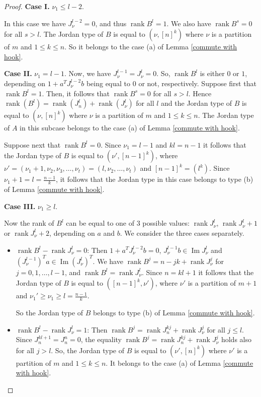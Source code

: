 \documentclass[10pt,a4paper]{amsart}
\DeclareMathOperator{\im}{Im}
\DeclareMathOperator{\rank}{rank}
\begin{document}
\begin{proof}
{\bf Case I.} $\nu_1\leq l-2$.

In this case we have $J_{\nu}^{l-2}=0$, and thus $\rank B^{l}=1$. We also have $\rank B^{s}=0$ for all $s>l$. The Jordan type of $B$ is equal to 
$\left(\nu, [n]^k\right)$ where $\nu$ is a partition of $m$ and $1\leq k\leq n$. So it belongs to the case (a) of Lemma \ref{commute with hook}.

{\bf Case II.} $\nu_1= l-1.$
Now, we have $J_{\nu}^{l-1} =J_{\nu} ^l=0$. So, $\rank B^l$ is either $0$ or $1$, depending on $1+a^TJ_{\nu}^{l-2}b$ being equal to $0$ or not, respectively. Suppose first that $\rank B^l=1$. Then, it follows that $\rank B^{s}=0$ for all $s>l$. Hence $\rank(B^l)=\rank(J_n^l)+\rank(J_{\nu}^l )$ for all $l$ and the Jordan type of $B$ is equal to 
$\left(\nu, [n]^k\right)$ where $\nu$ is a partition of $m$ and $1\leq k\leq n$. The Jordan type of $A$ in this subcase belongs to the case (a) of Lemma \ref{commute with hook}.

Suppose next that $\rank B^l=0$. Since $\nu_1=l-1$ and $kl=n-1$ it follows that the Jordan type of $B$ is equal to $\left(\nu', [n-1]^k\right)$, where $\nu'=(\nu_1+1,\nu_2,\nu_3,\ldots, \nu_t)=(l,\nu_2,\ldots,\nu_t)$ and $[n-1]^k=(l^k)$. Since $\nu_1+1=l=\frac{n-1}{k}$, it follows that the Jordan type in this case belongs to type (b) of Lemma \ref{commute with hook}.

{\bf Case III.} $\nu_1\ge l.$

Now the rank of $B^l$ can be equal to one of $3$ possible values: $\rank J_{\nu}^l$, $\rank J_{\nu}^l+1$ or $\rank J_{\nu}^l+2$, depending on $a$ and $b$. We consider the three cases separately.

\begin{itemize}
    \item[(i)] $\rank B^l-\rank J_{\nu}^l=0$: Then $1+a^TJ_{\nu}^{l-2}b=0 $, $J_{\nu}^{l-1}b\in\im J_{\nu}^l $ and $\left(J_{\nu}^{l-1}\right)^Ta\in\im \left(J_{\nu}^l\right)^T $. We have $\rank B^j=n-jk+\rank J_{\nu}^j $ for $j=0,1,\ldots,l-1$, and $\rank B^l=\rank J_{\nu}^l $. Since $n=kl+1$ it follows that the Jordan type of $B$ is equal to $([n-1]^k,\nu' ) $, where $\nu'$ is a partition of $m+1$ and $\nu_1'\ge\nu_1\ge l  = \frac{n-1}{k} $. 

So the Jordan type of $B$ belongs to type (b) of Lemma \ref{commute with hook}.

\item[(ii)] $\rank B^l-\rank J_{\nu}^l=1$: Then $\rank B^j=\rank J_n^{kj}+\rank J_{\nu}^j $ for all $j\leq l$. Since $J_n^{kl+1}=J_n^n=0$, the equality $\rank B^j=\rank J_n^{kj}+\rank J_{\nu}^j$ holds also for all $j> l$.  So, the Jordan type of $B$ is equal to $\left(\nu', [n]^k\right)$ where $\nu'$ is a partition of $m$ and $1\leq k\leq n$. It belongs to the case (a) of Lemma \ref{commute with hook}.


\end{itemize}
\end{proof}
\end{document}
